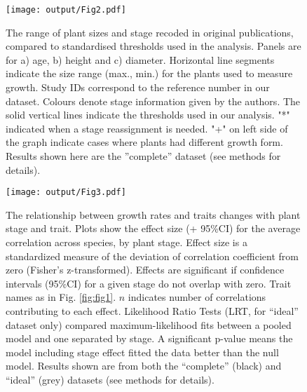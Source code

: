 \documentclass[a4paper,11pt]{article}
\begin{document}
\begin{figure}[h!]
\centering
\texttt{[image: output/Fig2.pdf]}
\caption{The range of plant sizes and stage recoded in original publications, compared to standardised thresholds used in the analysis. Panels are for
a) age, b) height and c) diameter. Horizontal line segments indicate the size range (max., min.) for the plants used to measure growth. Study IDs correspond to the reference number in our dataset. Colours denote stage information given by the authors. The solid vertical lines indicate the thresholds used in our analysis. "*" indicated when a stage reassignment is needed. "+" on left side of the graph indicate cases where plants had different growth form. Results shown here are the ''complete'' dataset (see methods for details).}
\label{fig:fig2}
\end{figure}

\begin{figure}[h!]
\centering
\texttt{[image: output/Fig3.pdf]}
\caption{The relationship between growth rates and traits changes with plant stage and trait. Plots show the effect size (+ 95\%CI) for the average correlation across species, by plant stage. Effect size is a standardized measure of the deviation of correlation coefficient from zero (Fisher's z-transformed). Effects are significant if confidence intervals (95\%CI) for a given stage do not overlap with zero.  Trait names as in Fig. \ref{fig:fig1}. $n$ indicates number of correlations contributing to each effect. Likelihood Ratio Tests (LRT, for ``ideal'' dataset only) compared maximum-likelihood fits between a pooled model and one separated by stage. A significant p-value means the model including stage effect fitted the data better than the null model. Results shown are from both the ``complete'' (black)  and ``ideal'' (grey) datasets (see methods for details).}
\label{fig:fig3}
\end{figure}

\clearpage
\end{document}
